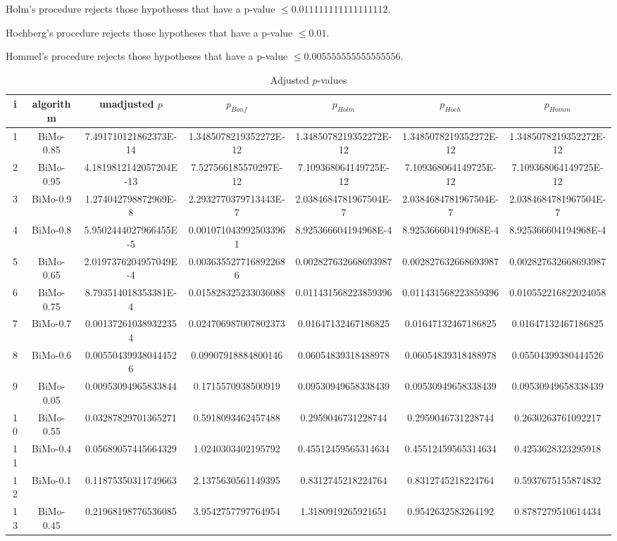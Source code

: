 \documentclass[a4paper,10pt]{article}
\begin{document}
\begin{landscape}
Holm's procedure rejects those hypotheses that have a p-value $\le0.011111111111111112$.


Hochberg's procedure rejects those hypotheses that have a p-value $\le0.01$.


Hommel's procedure rejects those hypotheses that have a p-value $\le0.005555555555555556$.


\begin{table}[!htp]
\centering\tiny
\caption{Adjusted $p$-values}
\begin{tabular}{ccccccc}
i&algorithm&unadjusted $p$&$p_{Bonf}$&$p_{Holm}$&$p_{Hoch}$&$p_{Homm}$\\
\hline
1&BiMo-0.85&7.491710121862373E-14&1.3485078219352272E-12&1.3485078219352272E-12&1.3485078219352272E-12&1.3485078219352272E-12\\
2&BiMo-0.95&4.1819812142057204E-13&7.527566185570297E-12&7.109368064149725E-12&7.109368064149725E-12&7.109368064149725E-12\\
3&BiMo-0.9&1.274042798872969E-8&2.2932770379713443E-7&2.0384684781967504E-7&2.0384684781967504E-7&2.0384684781967504E-7\\
4&BiMo-0.8&5.9502444027966455E-5&0.0010710439925033961&8.925366604194968E-4&8.925366604194968E-4&8.925366604194968E-4\\
5&BiMo-0.65&2.0197376204957049E-4&0.0036355277168922686&0.002827632668693987&0.002827632668693987&0.002827632668693987\\
6&BiMo-0.75&8.793514018353381E-4&0.015828325233036088&0.011431568223859396&0.011431568223859396&0.010552216822024058\\
7&BiMo-0.7&0.001372610389322354&0.024706987007802373&0.01647132467186825&0.01647132467186825&0.01647132467186825\\
8&BiMo-0.6&0.005504399380444526&0.09907918884800146&0.06054839318488978&0.06054839318488978&0.05504399380444526\\
9&BiMo-0.05&0.00953094965833844&0.1715570938500919&0.09530949658338439&0.09530949658338439&0.09530949658338439\\
10&BiMo-0.55&0.03287829701365271&0.5918093462457488&0.2959046731228744&0.2959046731228744&0.2630263761092217\\
11&BiMo-0.4&0.05689057445664329&1.0240303402195792&0.45512459565314634&0.45512459565314634&0.4253628323295918\\
12&BiMo-0.1&0.11875350311749663&2.1375630561149395&0.8312745218224764&0.8312745218224764&0.5937675155874832\\
13&BiMo-0.45&0.21968198776536085&3.9542757797764954&1.3180919265921651&0.9542632583264192&0.8787279510614434\\

\end{tabular}
\end{table}
\end{landscape}
\end{document}
